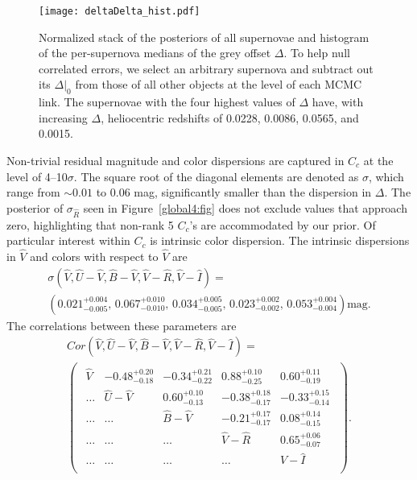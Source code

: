 \documentclass{aastex61}   	%
\begin{document}
\begin{figure}[htbp] %
   \centering
   \texttt{[image: deltaDelta\_hist.pdf]} 
   \caption{
   Normalized \color{red} stack of the posteriors of all supernovae \color{black} and histogram of the \color{red} per-supernova \color{black} medians of the grey offset $\Delta$. 
   \color{red}  To help null correlated errors, we select
    an arbitrary supernova and subtract out its $\Delta|_0$ from those of all other objects at the level of each MCMC link.
   \color{black}
   The supernovae with the four highest values of $\Delta$ have, with increasing $\Delta$, heliocentric
   redshifts of 0.0228, 0.0086, 0.0565, and 0.0015.
   \label{hist:fig}}
\end{figure}

Non-trivial residual magnitude
and color dispersions are captured in $C_c$
at the level of 4--10$\sigma$.
The square
root of the diagonal elements are denoted as $\sigma$, which
range from
$\sim 0.01$ to 0.06 mag, significantly smaller
than the dispersion in $\Delta$.
\color{green}
The posterior of $\sigma_{\hat{R}}$ seen in Figure~\ref{global4:fig} does not exclude values that approach zero, highlighting that non-rank 5
$C_c$'s are accommodated by our prior.
\color{black}
Of particular interest within $C_c$ is intrinsic color dispersion.  The intrinsic dispersions in ${\hat{V}}$ and colors with respect to ${\hat{V}}$ are
\begin{multline}
\sigma({\hat{V}},{\hat{U}}-{\hat{V}},{\hat{B}}-{\hat{V}},{\hat{V}}-{\hat{R}},{\hat{V}}-{\hat{I}})=\\
\left(
0.021^{+0.004}_{-0.005} ,\, 
0.067^{+0.010}_{-0.010},\, 
0.034^{+0.005}_{-0.005},\, 
0.023^{+0.002}_{-0.002},\, 
0.053^{+0.004}_{-0.004}
\right)
 \text{mag}.
 \label{sig_intrinsic:eqn}
 \end{multline}
The correlations between these parameters are
\begin{multline}
Cor({\hat{V}},{\hat{U}}-{\hat{V}},{\hat{B}}-{\hat{V}},{\hat{V}}-{\hat{R}},{\hat{V}}-{\hat{I}})=\\
\begin{pmatrix}
\begin{array}{rrrrr}
\hat{V} & -0.48^{+0.20}_{-0.18} & -0.34^{+0.21}_{-0.22} & 0.88^{+0.10}_{-0.25} & 0.60^{+0.11}_{-0.19} \\
\ldots & {\hat{U}}-{\hat{V}} & 0.60^{+0.10}_{-0.13} & -0.38^{+0.18}_{-0.17} & -0.33^{+0.15}_{-0.14} \\
\ldots  & \ldots & {\hat{B}}-{\hat{V}} & -0.21^{+0.17}_{-0.17} & 0.08^{+0.14}_{-0.15} \\
\ldots  & \ldots  &\ldots  & {\hat{V}}-{\hat{R}} & 0.65^{+0.06}_{-0.07} \\
\ldots  & \ldots  &\ldots  &\ldots & {\hat{V}}-{\hat{I}} \\
\end{array}
 \end{pmatrix}.
 \label{cor_intrinsic:eqn}
 \end{multline}
\end{document}
